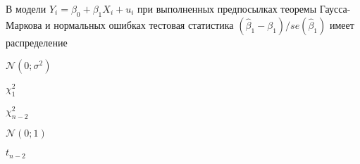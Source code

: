 
\begin{question}
В модели \(Y_i = \beta_0 + \beta_1 X_i + u_i\) при выполненных предпосылках теоремы Гаусса-Маркова и нормальных ошибках тестовая статистика
\((\hat\beta_1 - \beta_1)/se(\hat\beta_1)\) имеет распределение
\begin{answerlist}
  \item \(\mathcal{N}(0;\sigma^2)\)
  \item \(\chi^2_1\)
  \item \(\chi^2_{n-2}\)
  \item \(\mathcal{N}(0;1)\)
  \item \(t_{n-2}\)
\end{answerlist}
\end{question}


